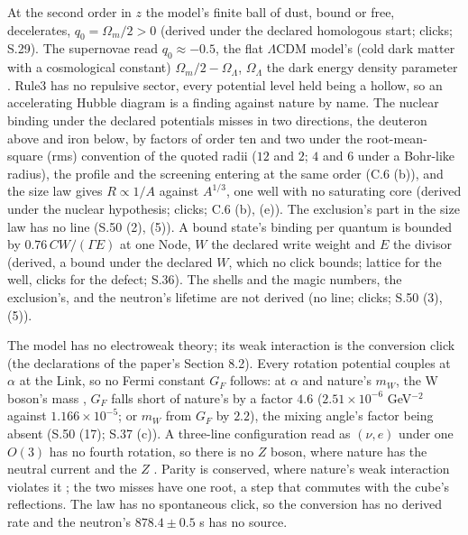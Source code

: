 \documentclass[pdflatex,sn-mathphys-num]{sn-jnl}
\theoremstyle{thmstyleone}
\begin{document}
At the second order in $z$ the model's finite ball of dust, bound or free, decelerates, $q_0 = \Omega_m / 2 > 0$ (derived under the declared homologous start; clicks; S.29). The supernovae read $q_0 \approx -0.5$, the flat $\Lambda$CDM model's (cold dark matter with a cosmological constant) $\Omega_m / 2 - \Omega_\Lambda$, $\Omega_\Lambda$ the dark energy density parameter \cite{riess}\cite{perlmutter}\cite{pantheon}. Rule3 has no repulsive sector, every potential level held being a hollow, so an accelerating Hubble diagram is a finding against nature by name. The nuclear binding under the declared potentials misses in two directions, the deuteron above and iron below, by factors of order ten and two under the root-mean-square (rms) convention of the quoted radii ($12$ and $2$; $4$ and $6$ under a Bohr-like radius), the profile and the screening entering at the same order (C.6 (b)), and the size law gives $R \propto 1 / A$ against $A^{1/3}$, one well with no saturating core (derived under the nuclear hypothesis; clicks; C.6 (b), (e)). The exclusion's part in the size law has no line (S.50 (2), (5)). A bound state's binding per quantum is bounded by $0.76\,CW / (\Gamma E)$ at one Node, $W$ the declared write weight and $E$ the divisor (derived, a bound under the declared $W$, which no click bounds; lattice for the well, clicks for the defect; S.36). The shells and the magic numbers, the exclusion's, and the neutron's lifetime are not derived (no line; clicks; S.50 (3), (5)).

The model has no electroweak theory; its weak interaction is the conversion click (the declarations of the paper's Section 8.2). Every rotation potential couples at $\alpha$ at the Link, so no Fermi constant $G_F$ follows: at $\alpha$ and nature's $m_W$, the W boson's mass \cite{pdg}, $G_F$ falls short of nature's by a factor $4.6$ ($2.51 \times 10^{-6}$ GeV$^{-2}$ against $1.166 \times 10^{-5}$; or $m_W$ from $G_F$ by $2.2$), the mixing angle's factor being absent (S.50 (17); S.37 (c)). A three-line configuration read as $(\nu, e)$ under one $O(3)$ has no fourth rotation, so there is no $Z$ boson, where nature has the neutral current \cite{hasert} and the $Z$ \cite{lep}. Parity is conserved, where nature's weak interaction violates it \cite{wu}; the two misses have one root, a step that commutes with the cube's reflections. The law has no spontaneous click, so the conversion has no derived rate and the neutron's $878.4 \pm 0.5$ s \cite{pdg} has no source.
\end{document}
